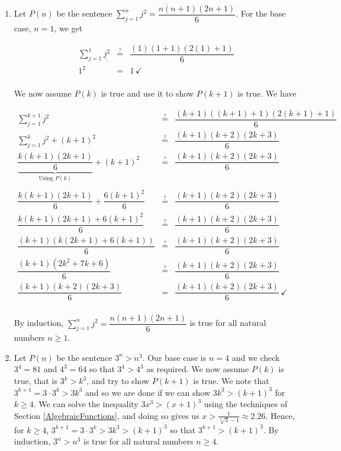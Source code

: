 \begin{enumerate}

\item  Let $P(n)$ be the sentence $\displaystyle{ \sum_{j=1}^{n} j^2 = \dfrac{n(n+1)(2n+1)}{6}}$. For the base case, $n=1$, we get

\[ \begin{array}{rcl} 

\displaystyle{ \sum_{j=1}^{1} j^2} & \stackrel{?}{=} &  \dfrac{(1)(1+1)(2(1)+1)}{6} \\ [15pt]
 1^2  & = & 1 \, \checkmark \\ \end{array} \]


We now assume $P(k)$ is true and use it to show $P(k+1)$ is true.  We have


\[ \begin{array}{rcl} 

\displaystyle{ \sum_{j=1}^{k+1} j^2} & \stackrel{?}{=} &  \dfrac{(k+1)((k+1)+1)(2(k+1)+1)}{6} \\ [15pt]
\displaystyle{ \sum_{j=1}^{k} j^2}  + (k+1)^2 &  \stackrel{?}{=}  & \dfrac{(k+1)(k+2)(2k+3)}{6} \\ [15pt]
\underbrace{\dfrac{k(k+1)(2k+1)}{6}}_{\text{Using $P(k)$}} + (k+1)^2 &  \stackrel{?}{=}  & \dfrac{(k+1)(k+2)(2k+3)}{6}  \\ 

&& \\

\dfrac{k(k+1)(2k+1)}{6} + \dfrac{6(k+1)^2}{6} &  \stackrel{?}{=}  & \dfrac{(k+1)(k+2)(2k+3)}{6}  \\ [10pt]
\dfrac{k(k+1)(2k+1)+6(k+1)^2}{6} &  \stackrel{?}{=}  & \dfrac{(k+1)(k+2)(2k+3)}{6}  \\ [10pt]
\dfrac{(k+1)(k(2k+1)+6(k+1))}{6} &  \stackrel{?}{=}  & \dfrac{(k+1)(k+2)(2k+3)}{6}  \\ [10pt]
\dfrac{(k+1)\left(2k^2+7k+6\right)}{6} &  \stackrel{?}{=}  & \dfrac{(k+1)(k+2)(2k+3)}{6}  \\ [10pt]
\dfrac{(k+1)(k+2)(2k+3)}{6} & = & \dfrac{(k+1)(k+2)(2k+3)}{6}  \, \checkmark \\ [10pt]
 \end{array} \]
 
 By induction, $\displaystyle{ \sum_{j=1}^{n} j^2 = \dfrac{n(n+1)(2n+1)}{6}}$ is true for all natural numbers $n \geq 1$.

\addtocounter{enumi}{2}

\item Let $P(n)$  be the sentence $3^n > n^3$.  Our base case is $n=4$ and we check $3^4 = 81$ and $4^3 = 64$ so that $3^4 > 4^3$ as required.  We now assume $P(k)$ is true, that is $3^k > k^3$, and try to show $P(k+1)$ is true.  We note that $3^{k+1} = 3 \cdot 3^{k} > 3k^3$ and so we are done if we can show $3k^3 > (k+1)^3$ for $k \geq 4$. We can solve the inequality $3x^3 > (x+1)^3$ using the techniques of Section \ref{AlgebraicFunctions}, and doing so gives us $x > \frac{1}{\sqrt[3]{3}-1} \approx 2.26.$  Hence, for $k \geq 4$, $3^{k+1} = 3 \cdot 3^{k} > 3k^3 > (k+1)^3$ so that $3^{k+1} > (k+1)^3$.   By induction, $3^n > n^3$ is true for all natural numbers $n \geq 4$.


\end{enumerate}

